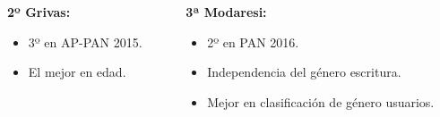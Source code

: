 \documentclass{beamer}
\begin{document}
\begin{frame}
\begin{columns}[T]
\begin{column}{0.8\textwidth}
\begin{description}[labelwidth=0.01mm]
\begin{itemize}
								\end{itemize}
						\vspace{0.8cm} \pause
						\item \textbf{2º Grivas:} 
							\begin{itemize}
								\item 3º en AP-PAN 2015.\pause
								\item El mejor en edad.\pause
							\end{itemize}
					\end{description}
				\end{column}
				\hspace{-3.5cm}
				\begin{column}{0.8\textwidth}
					\begin{description}[labelwidth=0.01mm] \pause
						\item \textbf{3ª Modaresi:} 
						\begin{itemize}
							\item 2º en PAN 2016.\pause
							\item Independencia del género escritura.\pause
							\item Mejor en clasificación de género usuarios.\pause
						\end{itemize}
%
%											
%											
					\end{description}
				\end{column}
			\end{columns}
		\end{frame}
\end{document}
